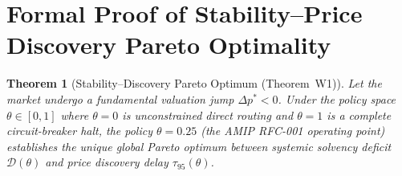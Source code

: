 \documentclass[11pt,a4paper]{article}
\newtheorem{theorem}{Theorem}[section]
\theoremstyle{definition}\newtheorem{definition}[theorem]{Definition}
\theoremstyle{remark}\newtheorem{remark}[theorem]{Remark}
\begin{document}
\section{Formal Proof of Stability--Price Discovery Pareto Optimality}
\label{sec:supp_welfare_pareto}
\begin{theorem}[Stability--Discovery Pareto Optimum (Theorem~W1)]\label{thm:supp_w1}
Let the market undergo a fundamental valuation jump $\Delta p^* < 0$. Under the policy space $\theta \in [0, 1]$ where $\theta = 0$ is unconstrained direct routing and $\theta = 1$ is a complete circuit-breaker halt, the policy $\theta = 0.25$ (the AMIP RFC-001 operating point) establishes the unique global Pareto optimum between systemic solvency deficit $\mathcal{D}(\theta)$ and price discovery delay $\tau_{95}(\theta)$.
\end{theorem}
\end{document}
